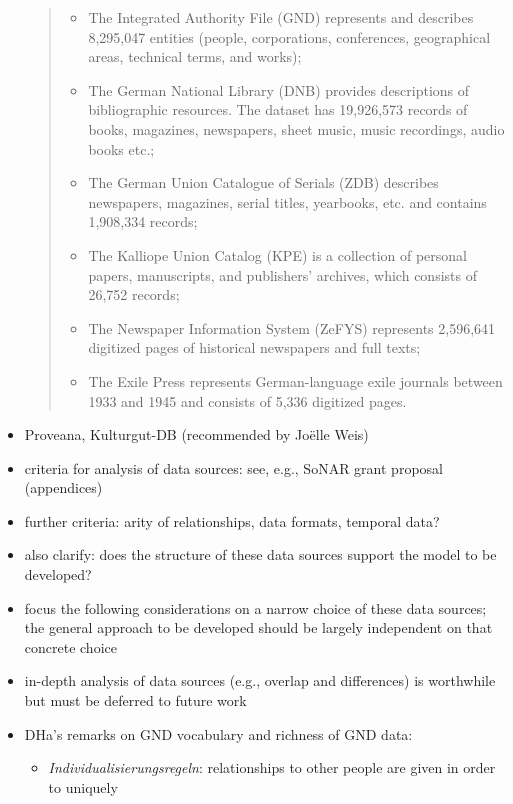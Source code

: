 \begin{itemize}
    \blockquote{%
      \begin{itemize}
        \item
          The Integrated Authority File (GND) represents and describes 8,295,047 entities (people, corporations, conferences, geographical areas, technical terms, and works);
        \item
          The German National Library (DNB) provides descriptions of bibliographic resources. The dataset has 19,926,573 records of books, magazines, newspapers, sheet music, music recordings, audio books etc.;
        \item
          The German Union Catalogue of Serials (ZDB) describes newspapers, magazines, serial titles, yearbooks, etc. and contains 1,908,334 records;
        \item
          The Kalliope Union Catalog (KPE) is a collection of personal papers, manuscripts, and publishers’ archives, which consists of 26,752 records;
        \item
          The Newspaper Information System (ZeFYS) represents 2,596,641 digitized pages of historical newspapers and full texts;
        \item
          The Exile Press represents German-language exile journals between 1933 and 1945 and consists of 5,336 digitized pages.
      \end{itemize}
    }
  \item
    Proveana, Kulturgut-DB (recommended by Jo\"elle Weis)
  \item 
    criteria for analysis of data sources: see, e.g., SoNAR grant proposal (appendices) 
  \item
    further criteria: arity of relationships, data formats, temporal data?
  \item
    also clarify: does the structure of these data sources support the model to be developed?
  \item
    focus the following considerations on a narrow choice of these data sources;
    the general approach to be developed should be largely independent on that concrete choice
  \item 
    in-depth analysis of data sources (e.g., overlap and differences) is worthwhile
    but must be deferred to future work
  \item
    DHa's remarks on GND vocabulary and richness of GND data:
    \begin{itemize}
      \item
        \emph{Individualisierungsregeln}: relationships to other people are given in order to uniquely

\end{itemize}
\end{itemize}
